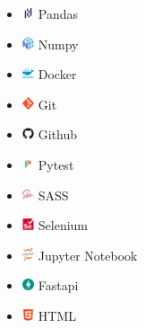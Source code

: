 \documentclass{article}
\begin{document}
\begin{multicols}{3}
\begin{itemize}
    \item \includegraphics[height=10pt]{images/icons/pandas-original.png} Pandas
    \item \includegraphics[height=10pt]{images/icons/numpy-original.png} Numpy
    \item \includegraphics[height=10pt]{images/icons/docker.png} Docker
    \item \includegraphics[height=10pt]{images/icons/git-original.png} Git
    \item \includegraphics[height=10pt]{images/icons/github-original.png} Github
    \item \includegraphics[height=10pt]{images/icons/pytest-original.png} Pytest 
    \item \includegraphics[height=10pt]{images/icons/sass-original.png} SASS
    \item \includegraphics[height=10pt]{images/icons/selenium-original.png} Selenium 
    \item \includegraphics[height=10pt]{images/icons/jupyter-original-wordmark.png} Jupyter Notebook
    \item \includegraphics[height=10pt]{images/icons/fastapi-original.png} Fastapi
    \item \includegraphics[height=10pt]{images/icons/html5-original.png} HTML

\end{itemize}
\end{multicols}
\end{document}
